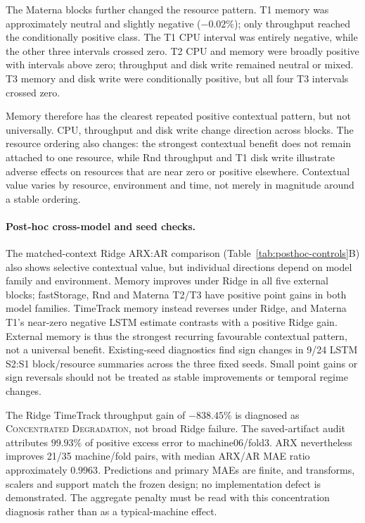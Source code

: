 \documentclass[a4paper,fleqn]{cas-dc}
\begin{document}
The Materna blocks further changed the resource pattern. T1 memory was
approximately neutral and slightly negative ($-0.02\%$); only throughput
reached the conditionally positive class. The T1 CPU interval was entirely
negative, while the other three intervals crossed zero. T2 CPU and memory
were broadly positive with intervals above zero; throughput and disk write
remained neutral or mixed. T3 memory and disk write were conditionally
positive, but all four T3 intervals crossed zero.

Memory therefore has the clearest repeated positive contextual pattern, but
not universally. CPU, throughput and disk write change direction across
blocks. The resource ordering also changes: the strongest contextual benefit
does not remain attached to one resource, while Rnd throughput and T1 disk
write illustrate adverse effects on resources that are near zero or positive
elsewhere. Contextual value varies by resource, environment and time, not
merely in magnitude around a stable ordering.

\paragraph{Post-hoc cross-model and seed checks.}
The matched-context Ridge ARX:AR comparison
(Table~\ref{tab:posthoc-controls}B) also shows selective contextual value,
but individual directions depend on model family and environment. Memory
improves under Ridge in all five external blocks; fastStorage, Rnd and
Materna T2/T3 have positive point gains in both model families. TimeTrack
memory instead reverses under Ridge, and Materna T1's near-zero negative
LSTM estimate contrasts with a positive Ridge gain. External memory is thus
the strongest recurring favourable contextual pattern, not a universal
benefit. Existing-seed diagnostics find sign changes in 9/24 LSTM S2:S1
block/resource summaries across the three fixed seeds. Small point gains or
sign reversals should not be treated as stable improvements or temporal
regime changes.

The Ridge TimeTrack throughput gain of $-838.45\%$ is diagnosed as
\textsc{Concentrated Degradation}, not broad Ridge failure. The saved-artifact
audit attributes $99.93\%$ of positive excess error to machine06/fold3.
ARX nevertheless improves 21/35 machine/fold pairs, with median ARX/AR MAE
ratio approximately $0.9963$. Predictions and primary MAEs are finite, and
transforms, scalers and support match the frozen design; no implementation
defect is demonstrated. The aggregate penalty must be read with this
concentration diagnosis rather than as a typical-machine effect.
\end{document}
